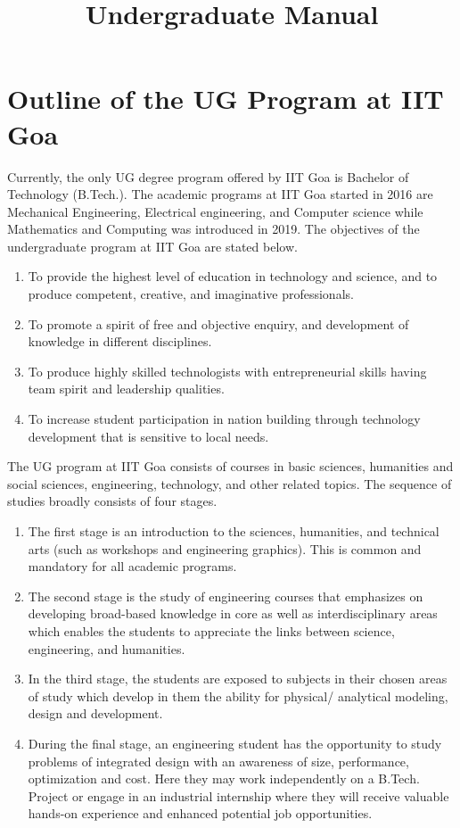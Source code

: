 \documentclass{article}[12pt]
\title{{\Huge Undergraduate Manual }}
\begin{document}
\maketitle	


\section{Outline of the UG Program at IIT Goa}
	
	Currently, the only UG degree program offered by IIT Goa is Bachelor of Technology (B.Tech.). The academic programs at IIT Goa started in 2016 are Mechanical Engineering, Electrical engineering, and Computer science while Mathematics and Computing was introduced in 2019. The objectives of the undergraduate program at IIT Goa are stated below.
	
	\begin{enumerate}
	\item To provide the highest level of education in technology and science, and to produce competent, creative, and imaginative professionals.
	\item To promote a spirit of free and objective enquiry, and development of knowledge in different disciplines. 
	\item To produce highly skilled technologists with entrepreneurial skills having team spirit and leadership qualities. 
	\item To increase student participation in nation building through technology development that is sensitive to local needs.
	\end{enumerate}
	 
	The UG program at IIT Goa consists of courses in basic sciences, humanities and social sciences, engineering, technology, and other related topics. The sequence of studies broadly consists of four stages.
	\begin{enumerate}
		 
	\item The first stage is an introduction to the sciences, humanities, and technical arts (such as workshops and engineering graphics). This is common and mandatory for all academic programs. 
	\item The second stage is the study of engineering courses that emphasizes on developing broad-based knowledge in core as well as interdisciplinary areas which enables the students to appreciate the links between science, engineering, and humanities. 
	\item In the third stage, the students are exposed to subjects in their chosen areas of study which develop in them the ability for physical/ analytical modeling, design and development. 
	\item During the final stage, an engineering student has the opportunity to study problems of integrated design with an awareness of size, performance, optimization and cost. Here they may work independently on a B.Tech. Project or engage in an industrial internship where they will receive valuable hands-on experience and enhanced potential job opportunities.
\end{enumerate}
\end{document}
